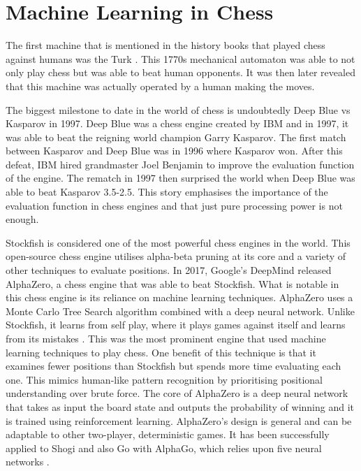 \section{Machine Learning in Chess}

The first machine that is mentioned in the history books that played chess against humans was the Turk \cite{stephensMechanicalTurkShort2023}. This 1770s mechanical automaton was able to not only play chess but was able to beat human opponents. It was then later revealed that this machine was actually operated by a human making the moves. 

The biggest milestone to date in the world of chess is undoubtedly Deep Blue vs Kasparov in 1997. Deep Blue was a chess engine created by IBM and in 1997, it was able to beat the reigning world champion Garry Kasparov. The first match between Kasparov and Deep Blue was in 1996 where Kasparov won. After this defeat, IBM hired grandmaster Joel Benjamin to improve the evaluation function of the engine. The rematch in 1997 then surprised the world when Deep Blue was able to beat Kasparov 3.5-2.5. This story emphasises the importance of the evaluation function in chess engines and that just pure processing power is not enough. 

Stockfish is considered one of the most powerful chess engines in the world. This open-source chess engine utilises alpha-beta pruning at its core and a variety of other techniques to evaluate positions. In 2017, Google's DeepMind released AlphaZero, a chess engine that was able to beat Stockfish. What is notable in this chess engine is its reliance on machine learning techniques. AlphaZero uses a Monte Carlo Tree Search algorithm combined with a deep neural network. Unlike Stockfish, it learns from self play, where it plays games against itself and learns from its mistakes \cite{kleinNeuralNetworksChess2022}. This was the most prominent engine that used machine learning techniques to play chess. One benefit of this technique is that it examines fewer positions than Stockfish but spends more time evaluating each one. This mimics human-like pattern recognition by prioritising positional understanding over brute force. The core of AlphaZero is a deep neural network that takes as input the board state and outputs the probability of winning and it is trained using reinforcement learning. AlphaZero's design is general and can be adaptable to other two-player, deterministic games. It has been successfully applied to Shogi and also Go with AlphaGo, which relies upon five neural networks \cite{kleinNeuralNetworksChess2022}.    

